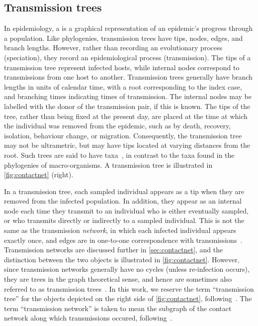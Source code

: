 \subsection{Transmission trees}

In epidemiology, a  is a graphical representation of an
epidemic's progress through a population. Like phylogenies, transmission trees
have tips, nodes, edges, and branch lengths. However, rather than recording an
evolutionary process (speciation), they record an epidemiological process
(transmission). The tips of a transmission tree represent infected hosts, while
internal nodes correspond to transmissions from one host to another.
Transmission trees generally have branch lengths in units of calendar time,
with a root corresponding to the index case, and branching times indicating
times of transmission. The internal nodes may be labelled with
the donor of the transmission pair, if this is known. The tips of the tree,
rather than being fixed at the present day, are placed at the time at which the
individual was removed from the epidemic, such as by death, recovery,
isolation, behaviour change, or migration. Consequently, the transmission tree
may not be ultrametric, but may have tips located at varying distances from the
root. Such trees are said to have 
taxa~\autocite{drummond2003measurably}, in contrast to the
 taxa found in the phylogenies of macro-organisms. A
transmission tree is illustrated in \cref{fig:contactnet} (right). 

In a transmission tree, each sampled individual appears as a tip when they are
removed from the infected population. In addition, they appear as an internal
node each time they transmit to an individual who is either eventually sampled,
or who transmits directly or indirectly to a sampled individual. This is not
the same as the transmission \emph{network}, in which each infected individual
appears exactly once, and edges are in one-to-one correspondence with
transmissions~\autocite{welch2011statistical, keeling2005networks}.
Transmission networks are discussed further in \cref{sec:contactnet}, and the
distinction between the two objects is illustrated in \cref{fig:contactnet}.
However, since transmission networks generally have no cycles (unless
re-infection occurs), they are trees in the graph theoretical sense, and hence
are sometimes also referred to as transmission
trees~\autocite[\eg][]{kenah2015algorithms}. In this work, we reserve the term
``transmission tree'' for the objects depicted on the right side of
\cref{fig:contactnet}, following~\autocite[\eg][]{stadler2013uncovering}. The
term ``transmission network'' is taken to mean the subgraph of the contact
network along which transmissions occured,
following~\autocite{welch2011statistical, keeling2005networks}.

